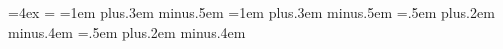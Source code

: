 \topmargin=0in                          %
\headheight=0in                         %
\headsep=0in                            %
\textheight=9in                         %
\footskip=4ex                           %
\textwidth=6in                          %
\parskip=\medskipamount                 %
\abovedisplayskip=1em plus.3em minus.5em        %
\belowdisplayskip=1em plus.3em minus.5em        %
\abovedisplayshortskip=.5em plus.2em minus.4em  %
\belowdisplayshortskip=.5em plus.2em minus.4em  %
\def\baselinestretch{1.2}       %
\thicklines                     %
\hsize=6in                      %
\lineskip=0pt                   %

%
%
\newcommand{\bim}[6]{\bibitem{#1}#2, {\em #3\/}$\;${\bf
#4}$\;$(#5)$\;${#6}.}

\newcommand{\bimn}[7]{\bibitem{#1}#2,
{\em #3}, { #4}\hspace{0.25em}{\bf
#5}\hspace{0.25em}(#6)\hspace{0.25em}{#7}.}

\newcommand{\bimna}[8]{\bibitem{#1}#2,
{\em #3}, { #4}\hspace{0.25em}{\bf
#5}\hspace{0.25em}(#6)\hspace{0.25em}{#7}\hspace{0.25em}(#8).}




%




